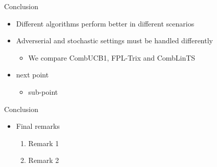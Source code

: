 \documentclass[10pt]{beamer}
\begin{document}
\begin{comment}
\begin{frame}{Counter-Factual Policy Experiments}
	\begin{enumerate}
		\item Gift tax on the dowry
		\item Conditional Cash Transfer schemes
		\begin{itemize}
			\item Parents receive transfers at different points in childhood, conditional on having a girl
			\item An insurance cover is provided, which matures when the girl turns 18 or 20
			\item Some schemes are restricted to low income families
		\end{itemize}
	\end{enumerate}
\end{frame}





\begin{frame}{Counter-Factual (Tax)}
	\begin{figure}
		\texttt{[image: Figures/counter\_tax]}
	\end{figure}
\end{frame}





\begin{frame}{Counter-Factual (Transfers)}
	\begin{figure}
		\texttt{[image: Figures/counter1]}
	\end{figure}
\end{frame}


\end{comment}

\begin{frame}{Conclusion}
	\begin{itemize}
		\item Different algorithms perform better in different scenarios
		\item Adverserial and stochastic settings must be handled differently
		\begin{itemize}
			\item We compare CombUCB1, FPL-Trix and CombLinTS
		\end{itemize}
		\item next point
		\begin{itemize}
			\item sub-point
		\end{itemize}
	\end{itemize}
\end{frame}




\begin{frame}{Conclusion}
	\begin{itemize}
		\item Final remarks
		\begin{enumerate}
			\item Remark 1
			\item Remark 2
		\end{enumerate}
	\end{itemize}
\end{frame}
\end{document}
